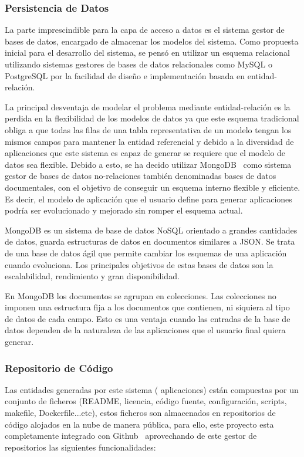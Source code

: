 \documentclass[a4paper,11pt]{book}
\begin{document}
\subsubsection{Persistencia de Datos}
La parte imprescindible para la capa de acceso a datos es el sistema gestor de bases de datos, encargado de almacenar los modelos del sistema. Como propuesta inicial para el desarrollo del sistema, se pensó en utilizar un esquema relacional utilizando sistemas gestores de bases de datos relacionales como MySQL o PostgreSQL  por la facilidad de diseño e implementación basada en entidad-relación.

La principal desventaja de modelar el problema mediante entidad-relación es la perdida en la flexibilidad de los modelos de datos ya que este esquema tradicional obliga a que todas las filas de una tabla representativa de un modelo tengan los mismos campos para mantener la entidad referencial y debido a la diversidad de aplicaciones que este sistema es capaz de generar se requiere que el modelo de datos sea flexible. Debido a esto, se ha decido utilizar MongoDB~\cite{mg} como sistema gestor de bases de datos no-relaciones también denominadas bases de datos documentales, con el objetivo de conseguir un esquema interno flexible y eficiente. Es decir, el modelo de aplicación que el usuario define para generar aplicaciones podría ser evolucionado y mejorado sin romper el esquema actual. 

MongoDB es un sistema de base de datos NoSQL orientado a grandes cantidades de datos, guarda estructuras de datos en documentos similares a JSON. Se trata de una base de datos ágil que permite cambiar los esquemas de una aplicación cuando evoluciona. Los principales objetivos de estas bases de datos son la escalabilidad, rendimiento y gran disponibilidad.

En MongoDB los documentos se agrupan en colecciones. Las colecciones  no imponen una estructura fija a los documentos que contienen, ni siquiera al tipo de datos de cada campo. Esto es una ventaja cuando las entradas de la base de datos dependen de la naturaleza de las aplicaciones que el usuario final quiera generar.


\subsubsection{Repositorio de Código}\label{repo}

Las entidades generadas por este sistema ( aplicaciones) están compuestas por un conjunto de ficheros (README, licencia, código fuente, configuración, scripts, makefile, Dockerfile...etc), estos ficheros son almacenados en repositorios de código alojados en la nube de manera pública, para ello, este proyecto esta completamente integrado con Github~\cite{github} aprovechando de este gestor de repositorios las siguientes funcionalidades: 
\end{document}
